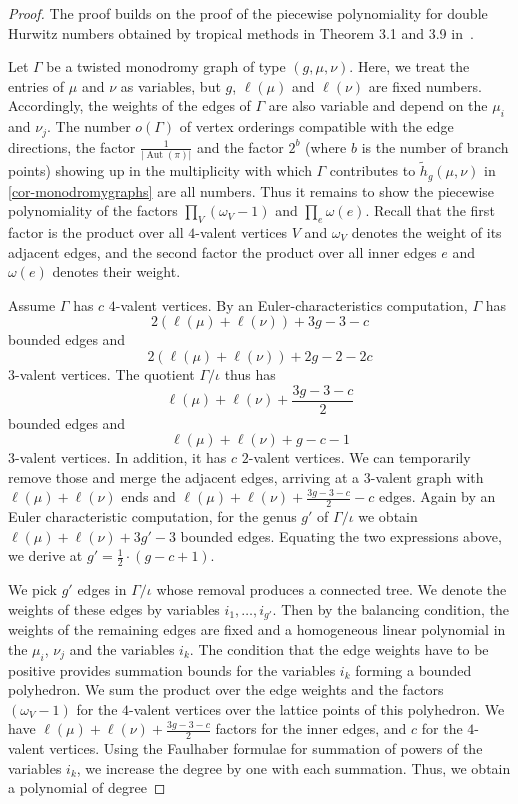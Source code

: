 \documentclass[ALCO,published]{cedram}
\DeclareMathOperator{\Aut}{Aut}
\begin{document}
\begin{proof}
The proof builds on the proof of the piecewise polynomiality for double Hurwitz numbers obtained by tropical methods in Theorem 3.1 and 3.9 in~\cite{CJM11}.

Let $\Gamma$ be a twisted monodromy graph of type $(g,\mu,\nu)$. Here, we treat the entries of $\mu$ and $\nu$ as variables, but $g$, $\ell(\mu)$ and $\ell(\nu)$ are fixed numbers. Accordingly, the weights of the edges of $\Gamma$ are also variable and depend on the $\mu_i$ and $\nu_j$. The number $o(\Gamma)$ of vertex orderings compatible with the edge directions, the factor $\frac{1}{|\Aut(\pi)|}$ and the factor $2^{b}$ (where $b$ is the number of branch points) showing up in the multiplicity with which $\Gamma$ contributes to $\tilde{h}_g(\mu,\nu)$ in \cref{cor-monodromygraphs} are all numbers. Thus it remains to show the piecewise polynomiality of the factors $\prod_V (\omega_V-1)$ and $\prod_e\omega(e)$. Recall that the first factor is the product over all $4$-valent vertices $V$ and $\omega_V$ denotes the weight of its adjacent edges, and the second factor the product over all inner edges $e$ and $\omega(e)$ denotes their weight.

Assume $\Gamma$ has $c$ $4$-valent vertices. By an Euler-characteristics computation, $\Gamma$ has $$2(\ell(\mu)+\ell(\nu))+3g-3-c$$ bounded edges and $$ 2(\ell(\mu)+\ell(\nu))+2g-2-2c$$ $3$-valent vertices. The quotient $\Gamma/\iota$ thus has $$\ell(\mu)+\ell(\nu)+\frac{3g-3-c}{2}$$ bounded edges and $$\ell(\mu)+\ell(\nu)+g-c-1$$ $3$-valent vertices. In addition, it has $c$ $2$-valent vertices. We can temporarily remove those and merge the adjacent edges, arriving at a $3$-valent graph with $\ell(\mu)+\ell(\nu)$ ends and $\ell(\mu)+\ell(\nu)+\frac{3g-3-c}{2}-c$ edges. Again by an Euler characteristic computation, for the genus $g'$ of $\Gamma/\iota$ we obtain
$\ell(\mu)+\ell(\nu)+3g'-3$ bounded edges. Equating the two expressions above, we derive at $g'=\frac{1}{2}\cdot (g-c+1)$.

We pick  $g'$ edges in $\Gamma/\iota$ whose removal produces a connected tree. We denote the weights of these edges by variables $i_1,\ldots,i_{g'}$. Then by the balancing condition, the weights of the remaining edges are fixed and a homogeneous linear polynomial in the $\mu_i$, $\nu_j$ and the variables $i_k$. The condition that the edge weights have to be positive provides summation bounds for the variables $i_k$ forming a bounded polyhedron. We sum the product over the edge weights and the factors $(\omega_V-1)$ for the $4$-valent vertices over the lattice points of this polyhedron. We have $\ell(\mu)+\ell(\nu)+\frac{3g-3-c}{2}$ factors for the inner edges, and $c$ for the $4$-valent vertices. Using the Faulhaber formulae for summation of powers of the variables $i_k$, we increase the degree by one with each summation.
Thus, we obtain a polynomial of degree 


\end{proof}
\end{document}
